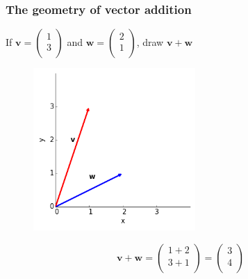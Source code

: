 \documentclass{beamer}
\begin{document}
\begin{frame}
\frametitle{The geometry of vector addition}
If 
	$\mathbf{v} = \left(
	\begin{array}{c}
	1\\
	3\\
	\end{array}
	\right)$ 
and 
	$\mathbf{w} = \left(
	\begin{array}{c}
	2\\
	1\\
	\end{array}
	\right)$, draw $\mathbf{v+w} $

\begin{figure}[htbp]
\begin{center}
 \includegraphics[width=0.55\textwidth]{figure2a.png}
\caption{}
\end{center}
\end{figure}
	
\end{frame}
\begin{frame}
$$\mathbf{v+w} = \left(
	\begin{array}{c}
	1+2\\
	3+1\\
	\end{array}
	\right) 
	= 
	\left(
	\begin{array}{c}
	3\\
	4\\
	\end{array}
	\right)$$\\



\end{frame}
\end{document}
